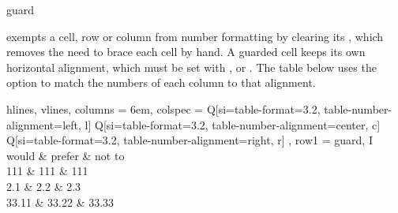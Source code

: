 \begin{codedescribe}[
        key,
        new=2022B
    ]{guard}
    \begin{codesyntax}
    \end{codesyntax}
     exempts a cell, row or column from number formatting by clearing its , which removes the need to brace each cell by hand. A guarded cell keeps its own horizontal alignment, which must be set with ,  or . The table below uses the  option  to match the numbers of each column to that alignment.

    \begin{codestore}[st=lib:si:guard]
        \begin{tblr}{
                hlines, vlines, columns = {6em},
                colspec = {
                        Q[si={table-format=3.2, table-number-alignment=left}, l]
                        Q[si={table-format=3.2, table-number-alignment=center}, c]
                        Q[si={table-format=3.2, table-number-alignment=right}, r]
                    },
                row{1} = {guard},
            }
            I would & prefer & not to \\
            111     & 111    & 111    \\
            2.1     & 2.2    & 2.3    \\
            33.11   & 33.22  & 33.33
        \end{tblr}\end{codestore}
    \begin{center}
    \end{center}
\end{codedescribe}

